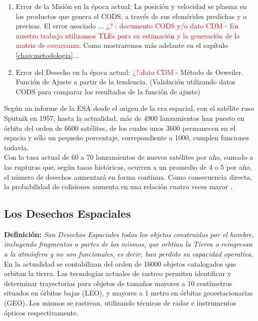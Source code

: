 \begin{enumerate}
 \item Error de la Misi\'on en la \'epoca actual: La posici\'on y velocidad se plasma en los productos que genera el CODS, a trav\'es de sus efem\'erides predichas y o precisas. El error asociado ... {\textcolor{red}{¿? : documento CODS y/o dato CDM}} - {\textcolor{red}{En nuestro trabajo utilizamos TLEs para su estimaci\'on y la generaci\'on de la matriz de covarianza.}} Como mostraremos m\'as adelante en el capítulo \ref{chap:metodologia}...\\
 \item Error del Desecho en la \'epoca actual: {\textcolor{red}{¿?:dato CDM}} - M\'etodo de Osweiler. Funci\'on de Ajuste a partir de la tendencia. (Validaci\'on utilizando datos CODS para comparar los resultados de la funci\'on de ajuste)
 
\end{enumerate}
Seg\'un un informe de la \ac{ESA} desde el origen de la era espacial, con el sat\'elite ruso Sputnik en 1957, hasta la actualidad, m\'as de 4900 lanzamientos han puesto en \'orbita del orden de 6600 sat\'elites, de los cuales unos 3600 permanecen en el espacio y s\'olo un peque\~no porcentaje, correpondiente a 1000, cumplen funciones todav\'ia.\\
	Con la tasa actual de 60 a 70 lanzamientos de nuevos sat\'elites por a\~no, sumado a las rupturas que, seg\'un tasas hist\'oricas, ocurren a un promedio de 4 o 5 por a\~no, el n\'umero de desechos aumentar\'a en forma continua. Como consecuencia directa, la probabilidad de colisiones aumenta en una relaci\'on cuatro veces mayor \cite{esaSD}.\\

\subsection*{Los Desechos Espaciales}


{\bf{Definici\'on:}}{\it{ Son Desechos Espaciales todos los objetos construidos por el hombre, incluyendo fragmentos o partes de los mismos, que orbtian la Tierra o reingresan a la atm\'osfera y no son funcionales, es decir, han perdido su capacidad operativa.}} \cite{iadcguide}\\

En la actualidad se contabilizan del orden de 16000 objetos catalogados que orbitan la tierra. Las tecnolog\'ias actuales de rastreo permiten identificar y determinar trayectorias para objetos de tamaños mayores a 10 cent\'imetros situados en \'orbitas bajas (LEO), y mayores a 1 metro en \'orbitas geoestacionarias (GEO). Los mismos se rastrean, utilizando t\'ecnicas de radar e instrumentos \'opticos respectivamente.\\

